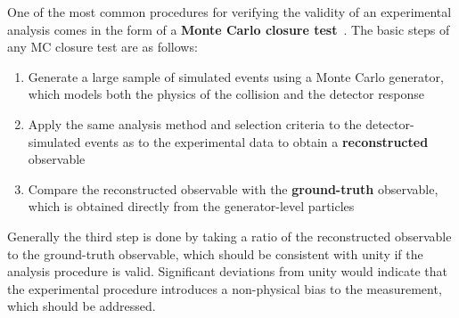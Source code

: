 One of the most common procedures for verifying the validity of an experimental analysis comes in the form of a \textbf{Monte Carlo closure test}~\cite{MCClosure}. The basic steps of any MC closure test are as follows:
%
\begin{enumerate}
    \item Generate a large sample of simulated events using a Monte Carlo generator, which models both the physics of the collision and the detector response
    \item Apply the same analysis method and selection criteria to the detector-simulated events as to the experimental data to obtain a \textbf{reconstructed} observable
    \item Compare the reconstructed observable with the \textbf{ground-truth} observable, which is obtained directly from the generator-level particles
\end{enumerate}
%
Generally the third step is done by taking a ratio of the reconstructed observable to the ground-truth observable, which should be consistent with unity if the analysis procedure is valid. Significant deviations from unity would indicate that the experimental procedure introduces a non-physical bias to the measurement, which should be addressed.  

